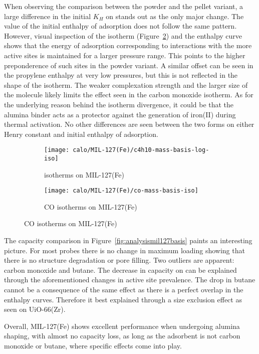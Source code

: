 When observing the comparison between the powder and the pellet variant, a large
difference in the initial \(K_H\) on  stands out as the only major change.
The value of the initial enthalpy of adsorption does not follow the same pattern.
However, visual inspection of the isotherm (Figure~\ref{fgr:mil127coads})
and the enthalpy curve shows that the energy of adsorption corresponding to
interactions with the more active sites is maintained for a larger pressure 
range. This points to the higher preponderence of such sites in the powder
variant. A similar offset can be seen in the propylene enthalpy at very low
pressures, but this is not reflected in the shape of the isotherm. The weaker 
complexation strength and the larger size of the molecule likely limits the effect 
seen in the carbon monoxide isotherm. As for the underlying reason behind the 
isotherm divergence, it could be that the alumina binder acts as a protector against the 
generation of iron(II) during thermal activation.
No other differences are seen between the two forms on either Henry constant and
initial enthalpy of adsorption.

\begin{figure}[ht]
    \begin{subfigure}{0.5\textwidth}
        \texttt{[image: calo/MIL-127(Fe)/c4h10-mass-basis-log-iso]}
        \caption{ isotherms on MIL-127(Fe)}%
        \label{fgr:mil127c4h10ads}
    \end{subfigure}
    \begin{subfigure}{0.5\textwidth}
        \texttt{[image: calo/MIL-127(Fe)/co-mass-basis-iso]}
        \caption{CO isotherms on MIL-127(Fe)}%
        \label{fgr:mil127coads}
    \end{subfigure}%
    \label{fgr:mil127isotherms}
\end{figure}

The capacity comparison in Figure~\ref{fig:analysismil127basis} paints an interesting 
picture. For most probes there is no change in maximum loading showing that there is no
structure degradation or pore filling. Two outliers are apparent: carbon monoxide and 
butane. The decrease in capacity on  can be explained through the 
aforementioned changes in active site prevalence. The drop in butane cannot be a 
consequence of the same effect as there is a perfect overlap in the enthalpy curves.
Therefore it best explained through a size exclusion effect as seen on UiO-66(Zr).

Overall, MIL-127(Fe) shows excellent performance when undergoing alumina shaping, with 
almost no capacity loss, as long as the adsorbent is not carbon monoxide or butane, 
where specific effects come into play.

